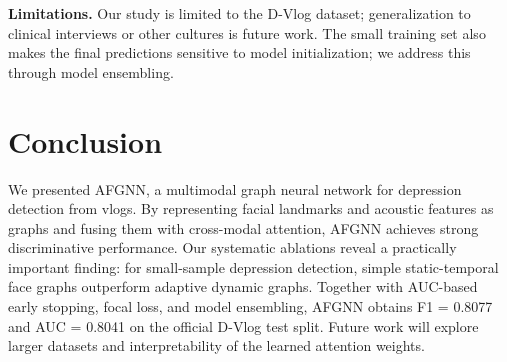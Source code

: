 \documentclass[conference]{IEEEtran}
\begin{document}
\textbf{Limitations.}
Our study is limited to the D-Vlog dataset; generalization to clinical interviews or other cultures is future work.
The small training set also makes the final predictions sensitive to model initialization; we address this through model ensembling.

\section{Conclusion}
\label{sec:conclusion}

We presented AFGNN, a multimodal graph neural network for depression detection from vlogs.
By representing facial landmarks and acoustic features as graphs and fusing them with cross-modal attention, AFGNN achieves strong discriminative performance.
Our systematic ablations reveal a practically important finding: for small-sample depression detection, simple static-temporal face graphs outperform adaptive dynamic graphs.
Together with AUC-based early stopping, focal loss, and model ensembling, AFGNN obtains F1 = 0.8077 and AUC = 0.8041 on the official D-Vlog test split.
Future work will explore larger datasets and interpretability of the learned attention weights.



\end{document}
